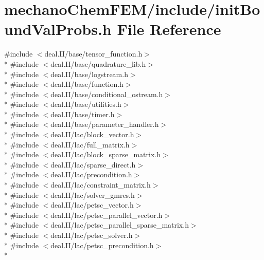 \section{mechano\-Chem\-F\-E\-M/include/init\-Bound\-Val\-Probs.h File Reference}
\label{init_bound_val_probs_8h}
{\ttfamily \#include $<$deal.\-I\-I/base/tensor\-\_\-function.\-h$>$}\\*
{\ttfamily \#include $<$deal.\-I\-I/base/quadrature\-\_\-lib.\-h$>$}\\*
{\ttfamily \#include $<$deal.\-I\-I/base/logstream.\-h$>$}\\*
{\ttfamily \#include $<$deal.\-I\-I/base/function.\-h$>$}\\*
{\ttfamily \#include $<$deal.\-I\-I/base/conditional\-\_\-ostream.\-h$>$}\\*
{\ttfamily \#include $<$deal.\-I\-I/base/utilities.\-h$>$}\\*
{\ttfamily \#include $<$deal.\-I\-I/base/timer.\-h$>$}\\*
{\ttfamily \#include $<$deal.\-I\-I/base/parameter\-\_\-handler.\-h$>$}\\*
{\ttfamily \#include $<$deal.\-I\-I/lac/block\-\_\-vector.\-h$>$}\\*
{\ttfamily \#include $<$deal.\-I\-I/lac/full\-\_\-matrix.\-h$>$}\\*
{\ttfamily \#include $<$deal.\-I\-I/lac/block\-\_\-sparse\-\_\-matrix.\-h$>$}\\*
{\ttfamily \#include $<$deal.\-I\-I/lac/sparse\-\_\-direct.\-h$>$}\\*
{\ttfamily \#include $<$deal.\-I\-I/lac/precondition.\-h$>$}\\*
{\ttfamily \#include $<$deal.\-I\-I/lac/constraint\-\_\-matrix.\-h$>$}\\*
{\ttfamily \#include $<$deal.\-I\-I/lac/solver\-\_\-gmres.\-h$>$}\\*
{\ttfamily \#include $<$deal.\-I\-I/lac/petsc\-\_\-vector.\-h$>$}\\*
{\ttfamily \#include $<$deal.\-I\-I/lac/petsc\-\_\-parallel\-\_\-vector.\-h$>$}\\*
{\ttfamily \#include $<$deal.\-I\-I/lac/petsc\-\_\-parallel\-\_\-sparse\-\_\-matrix.\-h$>$}\\*
{\ttfamily \#include $<$deal.\-I\-I/lac/petsc\-\_\-solver.\-h$>$}\\*
{\ttfamily \#include $<$deal.\-I\-I/lac/petsc\-\_\-precondition.\-h$>$}\\*
